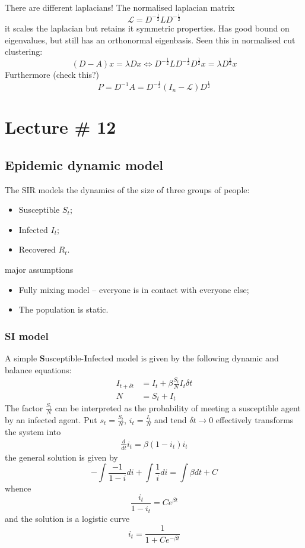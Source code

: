 \documentclass[a4paper]{article}
\newcommand{\Lcal}{\mathcal{L}}
\begin{document}

There are different laplacians! The normalised laplacian matrix
\[\Lcal = D^{-\frac{1}{2}} L D^{-\frac{1}{2}} \]
it scales the laplacian but retains it symmetric properties. Has good bound on
eigenvalues, but still has an orthonormal eigenbasis. Seen this in normalised
cut clustering:
\[
(D-A) x
= \lambda D x 
\Leftrightarrow
D^{-\frac{1}{2}} L D^{-\frac{1}{2}} D^\frac{1}{2} x
= \lambda D^\frac{1}{2} x
\]
Furthermore (check this?)
\[
P
= D^{-1} A
= D^{-\frac{1}{2}}(I_n - \Lcal)D^\frac{1}{2}
\]



\section{Lecture \# 12} %
\label{sec:lecture_12}

\subsection{Epidemic dynamic model} %
\label{sub:epidemic_dynamic_model}

The SIR models the dynamics of the size of three groups of people:\begin{itemize}
	\item Susceptible $S_t$;
	\item Infected $I_t$;
	\item Recovered $R_t$.
\end{itemize}

major assumptions \begin{itemize}
	\item Fully mixing model -- everyone is in contact with everyone else;
	\item The population is static.
\end{itemize}

\subsubsection{SI model} %
\label{ssub:si_model}

A simple \textbf{S}usceptible-\textbf{I}nfected model is given by the following dynamic and balance equations:
\begin{align*}
	I_{t+\delta t} &= I_t + \beta \frac{S_t}{N} I_t \delta t\\
	N &= S_t + I_t
\end{align*}
The factor $\frac{S_t}{N}$ can be interpreted as the probability of meeting a
susceptible agent by an infected agent.
Put $s_t = \frac{S_t}{N}$, $i_t = \frac{I_t}{N}$ and tend $\delta t \to 0$ effectively transforms the system into
\begin{align*}
	\frac{d}{dt}i_t = \beta (1 - i_t) i_t
\end{align*}
the general solution is given by
\[ -\int \frac{-1}{1-i} di + \int \frac{1}{i} di = \int \beta dt + C \]
whence
\[ \frac{i_t}{1-i_t} = Ce^{\beta t} \]
and the solution is a logistic curve
\[i_t = \frac{1}{1+Ce^{-\beta t}} \]
\end{document}
